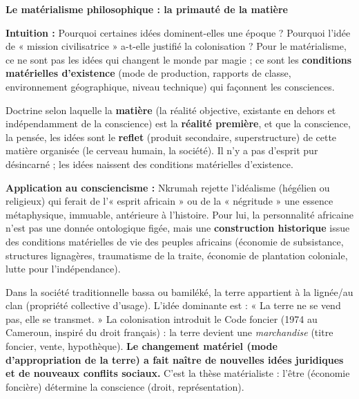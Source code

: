 \documentclass[11pt]{article}
\newcommand{\cle}[1]{{\popxbold\color{popdark}#1}}
\begin{document}
\textbf{Le matérialisme philosophique : la primauté de la matière}\par

\textbf{Intuition :} Pourquoi certaines idées dominent-elles une époque ? Pourquoi l'idée de « mission civilisatrice » a-t-elle justifié la colonisation ? Pour le matérialisme, ce ne sont pas les idées qui changent le monde par magie ; ce sont les \textbf{conditions matérielles d'existence} (mode de production, rapports de classe, environnement géographique, niveau technique) qui façonnent les consciences.

\begin{definition}
Doctrine selon laquelle la \textbf{matière} (la réalité objective, existante en dehors et indépendamment de la conscience) est la \textbf{réalité première}, et que la conscience, la pensée, les idées sont le \textbf{reflet} (produit secondaire, superstructure) de cette matière organisée (le cerveau humain, la société). Il n'y a pas d'esprit pur désincarné ; les idées naissent des conditions matérielles d'existence.
\end{definition}

\textbf{Application au consciencisme :} Nkrumah rejette l'idéalisme (hégélien ou religieux) qui ferait de l'« esprit africain » ou de la « négritude » une essence métaphysique, immuable, antérieure à l'histoire. Pour lui, la \cle{personnalité africaine} n'est pas une donnée ontologique figée, mais une \textbf{construction historique} issue des conditions matérielles de vie des peuples africains (économie de subsistance, structures lignagères, traumatisme de la traite, économie de plantation coloniale, lutte pour l'indépendance).

\begin{exemplebox}
Dans la société traditionnelle bassa ou bamiléké, la terre appartient à la lignée/au clan (propriété collective d'usage). L'idée dominante est : « La terre ne se vend pas, elle se transmet. » La colonisation introduit le Code foncier (1974 au Cameroun, inspiré du droit français) : la terre devient une \emph{marchandise} (titre foncier, vente, hypothèque). \textbf{Le changement matériel (mode d'appropriation de la terre) a fait naître de nouvelles idées juridiques et de nouveaux conflits sociaux.} C'est la thèse matérialiste : l'être (économie foncière) détermine la conscience (droit, représentation).
\end{exemplebox}
\end{document}
